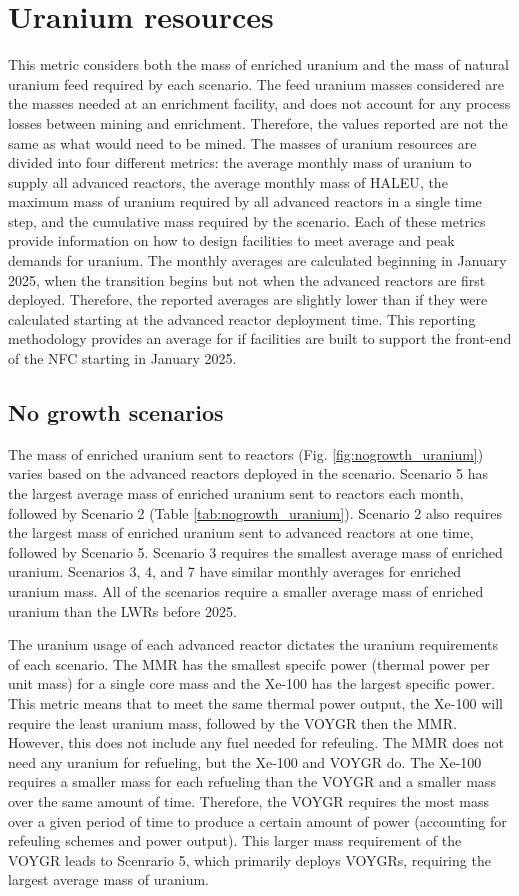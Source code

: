 \section{Uranium resources}
This metric considers  
both the mass of enriched uranium and the mass of natural uranium feed 
required by each scenario. The feed uranium masses 
considered are the masses needed at an enrichment facility,
and does not account for any process losses between mining and 
enrichment. Therefore, the values reported are not the same as what would 
need to be mined. The masses of uranium resources are divided into four 
different metrics: the average monthly mass of uranium to supply all 
advanced reactors, the average monthly mass of \gls{HALEU}, the 
maximum mass of uranium required by all advanced 
reactors in a single time step, and the cumulative mass required by the 
scenario. Each of these metrics provide information 
on how to design facilities to meet average and peak demands for 
uranium. The monthly averages are calculated beginning in January 2025, 
when the transition begins but not when the advanced reactors 
are first deployed. Therefore, the reported averages are slightly lower 
than if they were calculated starting at the advanced reactor deployment 
time. This reporting methodology provides an average for if 
facilities are built to support the front-end of the \gls{NFC} starting 
in January 2025. 

\subsection{No growth scenarios}
The mass of enriched uranium sent to reactors (Fig. \ref{fig:nogrowth_uranium})
varies based on the advanced reactors deployed in the scenario. 
Scenario 5 has the largest average mass of enriched uranium sent to 
reactors each month, followed by Scenario 2 (Table 
\ref{tab:nogrowth_uranium}). 
Scenario 2 also requires the largest mass of enriched uranium sent 
to advanced reactors at one time, followed by Scenario 5.
Scenario 3 requires the smallest average 
mass of enriched uranium. Scenarios 3, 4, and 7 
have similar monthly averages for enriched uranium mass. All of the 
scenarios require a smaller 
average mass of enriched uranium than the \glspl{LWR} before 2025. 

The uranium usage of each advanced reactor dictates the uranium requirements 
of each scenario. The \gls{MMR} has the smallest specifc power (thermal 
power per unit mass) for a single core mass and the Xe-100 has the largest 
specific power. This metric means that to meet the same thermal power 
output, the Xe-100 will require the least uranium mass, followed by the 
VOYGR then the \gls{MMR}. However, this does not include any fuel needed for 
refeuling. The \gls{MMR} does not need any uranium for refueling, but the 
Xe-100 and VOYGR do. The Xe-100 requires a smaller mass for each refueling 
than the VOYGR and a smaller mass over the same amount of time. Therefore, 
the VOYGR requires the most mass over a given period of time to produce 
a certain amount of power (accounting for refeuling schemes and power  
output). This larger mass requirement of the VOYGR leads to Scenrario 5, 
which primarily deploys VOYGRs, requiring the largest average mass of 
uranium. 

